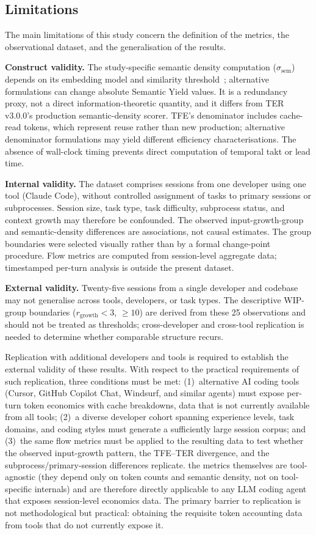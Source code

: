 \documentclass[journal]{IEEEtran}
\begin{document}
\subsection{Limitations}

The main limitations of this study concern the definition of the metrics, the observational dataset, and the generalisation of the results.

\textbf{Construct validity.} The study-specific semantic density computation ($\sigma_{\text{sem}}$) depends on its embedding model and similarity threshold~\cite{reimers2019}; alternative formulations can change absolute Semantic Yield values. It is a redundancy proxy, not a direct information-theoretic quantity, and it differs from TER v3.0.0's production semantic-density scorer. TFE's denominator includes cache-read tokens, which represent reuse rather than new production; alternative denominator formulations may yield different efficiency characterisations. The absence of wall-clock timing prevents direct computation of temporal takt or lead time.

\textbf{Internal validity.} The dataset comprises sessions from one developer using one tool (Claude Code), without controlled assignment of tasks to primary sessions or subprocesses. Session size, task type, task difficulty, subprocess status, and context growth may therefore be confounded. The observed input-growth-group and semantic-density differences are associations, not causal estimates. The group boundaries were selected visually rather than by a formal change-point procedure. Flow metrics are computed from session-level aggregate data; timestamped per-turn analysis is outside the present dataset.

\textbf{External validity.} Twenty-five sessions from a single developer and codebase may not generalise across tools, developers, or task types. The descriptive WIP-group boundaries ($r_{\text{growth}} < 3$, $\geq 10$) are derived from these 25 observations and should not be treated as thresholds; cross-developer and cross-tool replication is needed to determine whether comparable structure recurs.

Replication with additional developers and tools is required to establish the external validity of these results. With respect to the practical requirements of such replication, three conditions must be met: (1)~alternative AI coding tools (Cursor, GitHub Copilot Chat, Windsurf, and similar agents) must expose per-turn token economics with cache breakdowns, data that is not currently available from all tools; (2)~a diverse developer cohort spanning experience levels, task domains, and coding styles must generate a sufficiently large session corpus; and (3)~the same flow metrics must be applied to the resulting data to test whether the observed input-growth pattern, the TFE--TER divergence, and the subprocess/primary-session differences replicate. the metrics themselves are tool-agnostic (they depend only on token counts and semantic density, not on tool-specific internals) and are therefore directly applicable to any LLM coding agent that exposes session-level economics data. The primary barrier to replication is not methodological but practical: obtaining the requisite token accounting data from tools that do not currently expose it.
\end{document}
